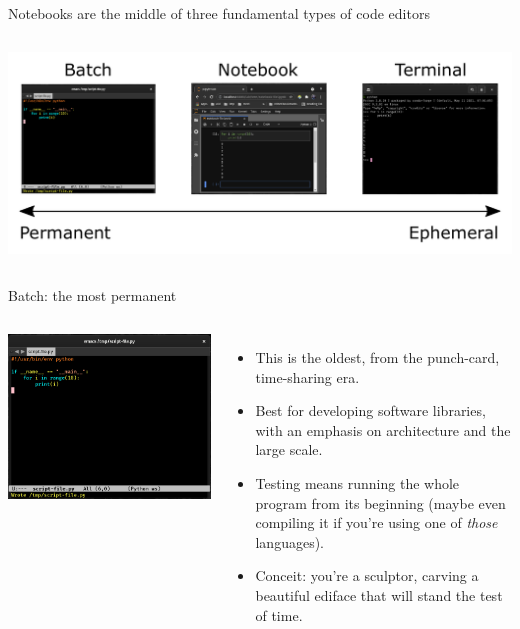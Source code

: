 \documentclass[aspectratio=169]{beamer}
\begin{document}
\begin{frame}{Notebooks are the middle of three fundamental types of code editors}
\vspace{0.2 cm}
\begin{columns}
\column{\linewidth}
\includegraphics[width=\linewidth]{img/fundamental-3-modes-of-programming.pdf}
\end{columns}
\end{frame}

\begin{frame}{Batch: the most permanent}
\vspace{0.2 cm}
\begin{columns}
\includegraphics[width=\linewidth]{img/fundamental-3-modes-batch.png}

\large
\begin{itemize}\setlength{\itemsep}{0.25 cm}
\item<1-> This is the oldest, from the punch-card, time-sharing era.
\item<2-> Best for developing software libraries, with an emphasis on architecture and the large scale.
\item<3-> Testing means running the whole program from its beginning (maybe even compiling it if you're using one of {\it those} languages).
\item<4-> Conceit: you're a sculptor, carving a beautiful ediface that will stand the test of time.
\end{itemize}
\end{columns}
\end{frame}
\end{document}
